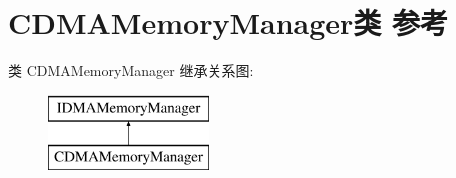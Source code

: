 \hypertarget{class_c_d_m_a_memory_manager}{}\section{C\+D\+M\+A\+Memory\+Manager类 参考}
\label{class_c_d_m_a_memory_manager}
类 C\+D\+M\+A\+Memory\+Manager 继承关系图\+:\begin{figure}[H]
\begin{center}
\leavevmode
\includegraphics[height=2.000000cm]{class_c_d_m_a_memory_manager}
\end{center}
\end{figure}
